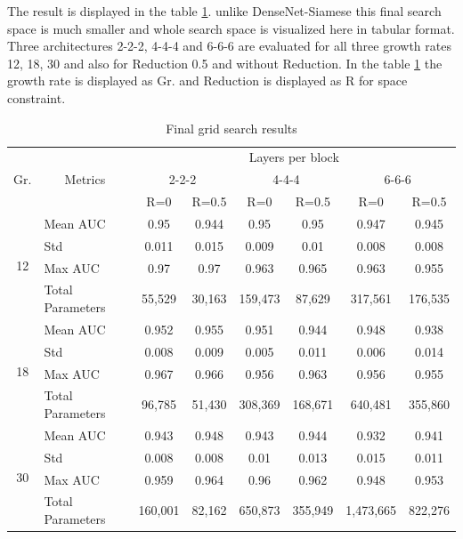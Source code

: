 The result is displayed in the table \ref{table:final_densenet_results}. unlike DenseNet-Siamese this final search space is much smaller and whole search space is visualized here in tabular format. Three architectures 2-2-2, 4-4-4 and 6-6-6 are 
evaluated for all three growth rates 12, 18, 30 and also for Reduction 0.5 and without Reduction. In the table \ref{table:final_densenet_results} the growth rate is displayed as Gr. and Reduction is displayed as R for space 
constraint.
\begin{center}
\begin{table}
 \caption{Final grid search results}
 \begin{tabular}{|c|l|cc|cc|cc|}\hline \hline
 \multirow{3}{*}{Gr.} & \multicolumn{1}{c|}{\multirow{3}{*}{Metrics}} & \multicolumn{6}{c|}{Layers per block} \\ \cline{3-8}
 & & \multicolumn{2}{c|}{2-2-2} & \multicolumn{2}{c|}{4-4-4} & \multicolumn{2}{c|}{6-6-6}\\ \cline{3-8}
 & & R=0 & R=0.5 & R=0 & R=0.5 & R=0 & R=0.5 \\ \hline \hline
 \multirow{4}{*}{12} & Mean AUC & \cellcolor{Gray}0.95 & \cellcolor{Gray}0.944 & \cellcolor{Gray}0.95 & \cellcolor{Gray}0.95 & \cellcolor{Gray}0.947 & \cellcolor{Gray}0.945 \\ %
  & Std & 0.011 & 0.015 & 0.009 & 0.01 & 0.008 & 0.008 \\ %
  & Max AUC & 0.97 & 0.97 & 0.963 & 0.965 & 0.963 & 0.955 \\ 
  & Total Parameters & 55,529 & 30,163 & 159,473 & 87,629 & 317,561 & 176,535 \\ \hline 
 \multirow{4}{*}{18} & Mean AUC & \cellcolor{Gray}0.952 & \cellcolor{Gray} 0.955 & \cellcolor{Gray} 0.951 & \cellcolor{Gray} 0.944 & \cellcolor{Gray} 0.948 & \cellcolor{Gray} 0.938 \\ %
  & Std & 0.008 & 0.009 & 0.005 & 0.011 & 0.006 & 0.014 \\ %
  & Max AUC & 0.967 & 0.966 & 0.956 & 0.963 & 0.956 & 0.955 \\ 
  & Total Parameters & 96,785 & 51,430 & 308,369 & 168,671 & 640,481 & 355,860 \\\hline 
 \multirow{4}{*}{30} & Mean AUC & \cellcolor{Gray} 0.943 & \cellcolor{Gray} 0.948 & \cellcolor{Gray} 0.943 & \cellcolor{Gray} 0.944 & \cellcolor{Gray} 0.932 & \cellcolor{Gray} 0.941 \\ %
  & Std & 0.008 & 0.008 & 0.01 & 0.013 & 0.015 & 0.011 \\ %
  & Max AUC & 0.959 & 0.964 & 0.96 & 0.962 & 0.948 & 0.953 \\ 
  & Total Parameters & 160,001 & 82,162 & 650,873 & 355,949 & 1,473,665 & 822,276 \\ \hline
 \hline
 \end{tabular}
\label{table:final_densenet_results}
\end{table}
\end{center}
